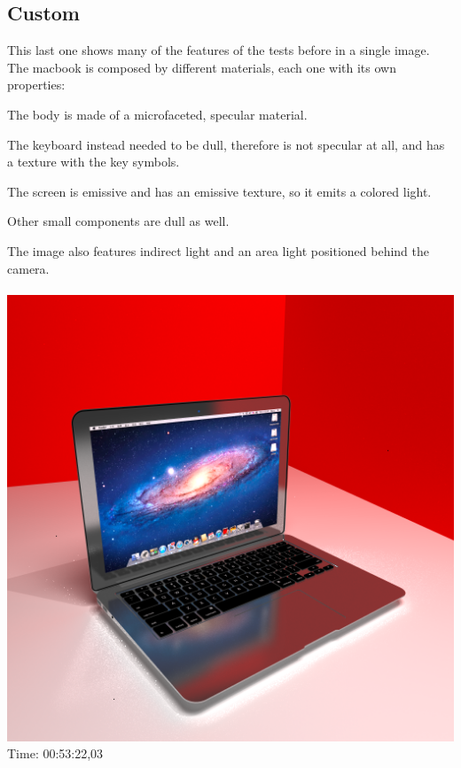\documentclass[12pt]{article} %
\begin{document}
\subsection{Custom}
This last one shows many of the features of the tests before in a single image. The macbook is composed by different materials, each one with its own properties:
\begin{list}{-}{spacing}
	\item The body is made of a microfaceted, specular material.
	\item The keyboard instead needed to be dull, therefore is not specular at all, and has a texture with the key symbols.
	\item The screen is emissive and has an emissive texture, so it emits a colored light.
	\item Other small components are dull as well.
\end{list}
The image also features indirect light and an area light positioned behind the camera.\\\\
\includegraphics[width=\linewidth]{Homework4/tests/macbook.png}
Time: 00:53:22,03 


\end{document}
